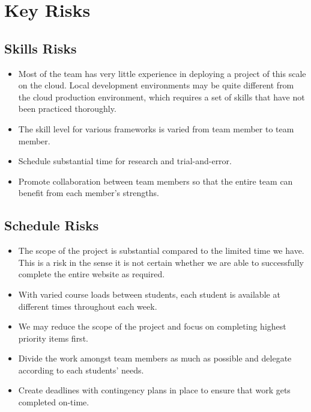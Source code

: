 \section{Key Risks}

\subsection{Skills Risks}
\begin{itemize}
\item Most of the team has very little experience in deploying a project of this scale on the cloud.  Local development environments may be quite different from the cloud production environment, which requires a set of skills that have not been practiced thoroughly.
\item The skill level for various frameworks is varied from team member to team member.
\end{itemize}

\begin{itemize}
\item Schedule substantial time for research and trial-and-error.
\item Promote collaboration between team members so that the entire team can benefit from each member's strengths.
\end{itemize}

\subsection{Schedule Risks}
\begin{itemize}
\item The scope of the project is substantial compared to the limited time we have.\\
This is a risk in the sense it is not certain whether we are able to successfully complete the entire website as required.
\item With varied course loads between students, each student is available at different times throughout each week.
\end{itemize}

\begin{itemize}
\item We may reduce the scope of the project and focus on completing highest priority items first.
\item Divide the work amongst team members as much as possible and delegate according to each students' needs.
\item Create deadlines with contingency plans in place to ensure that work gets completed on-time.
\end{itemize}

